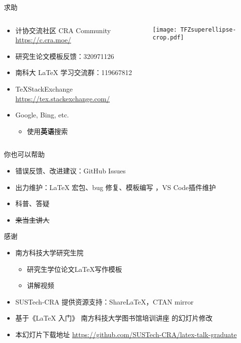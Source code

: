 \begin{frame}{求助}
  \begin{columns}[c]
    \begin{column}{.45\textwidth}
      \begin{itemize}
        \item 计协交流社区 CRA Community \url{https://c.cra.moe/}
        \item 研究生论文模板反馈：320971126
        \item 南科大 \LaTeX{} 学习交流群：119667812
        \item \TeX StackExchange \url{https://tex.stackexchange.com/}
        \item Google, Bing, etc.
          \begin{itemize}
            \item 使用\textbf{英语}搜索
          \end{itemize}
      \end{itemize}
    \end{column}
    \begin{column}{.45\textwidth}
      \texttt{[image: TFZsuperellipse-crop.pdf]}
    \end{column}
  \end{columns}
\end{frame}

\begin{frame}{你也可以帮助}
  \begin{itemize}
    \item 错误反馈、改进建议：GitHub Issues 
    \item 出力维护：\LaTeX{} 宏包、bug 修复、模板编写 ，VS Code插件维护 
    \item 科普、答疑
    \item \sout{来当主讲人}
  \end{itemize}
\end{frame}

\begin{frame}{感谢}
  \begin{itemize}
    \item 南方科技大学研究生院
    \begin{itemize}
      \item 研究生学位论文LaTeX写作模板 
      \item 讲解视频 
    \end{itemize}
    \item SUSTech-CRA 提供资源支持：ShareLaTeX，CTAN mirror
    \item 基于《LaTeX 入门》 南方科技大学图书馆培训讲座  的幻灯片修改
    \item 本幻灯片下载地址 \url{https://github.com/SUSTech-CRA/latex-talk-graduate}
  \end{itemize}
\end{frame}
